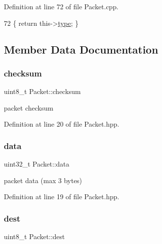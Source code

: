 Definition at line 72 of file Packet.\+cpp.


\begin{DoxyCode}
72 \{ \textcolor{keywordflow}{return} this->\hyperlink{class_packet_a496cc4e5c913eefa002539663d147cfb}{type}; \}
\end{DoxyCode}


\subsection{Member Data Documentation}
\mbox{\label{class_packet_a900989fb6f663e8c66faeadb3dc7a318}} 
\subsubsection{\texorpdfstring{checksum}{checksum}}
{\footnotesize\ttfamily uint8\+\_\+t Packet\+::checksum\hspace{0.3cm}{\ttfamily [private]}}



packet checksum 



Definition at line 20 of file Packet.\+hpp.

\mbox{\label{class_packet_a3db8a3abfccbe7a2c2b8f63b4b9fb31e}} 
\subsubsection{\texorpdfstring{data}{data}}
{\footnotesize\ttfamily uint32\+\_\+t Packet\+::data\hspace{0.3cm}{\ttfamily [private]}}



packet data (max 3 bytes) 



Definition at line 19 of file Packet.\+hpp.

\mbox{\label{class_packet_a0a6e83b74c425ade443382233ccfc865}} 
\subsubsection{\texorpdfstring{dest}{dest}}
{\footnotesize\ttfamily uint8\+\_\+t Packet\+::dest\hspace{0.3cm}{\ttfamily [private]}}



